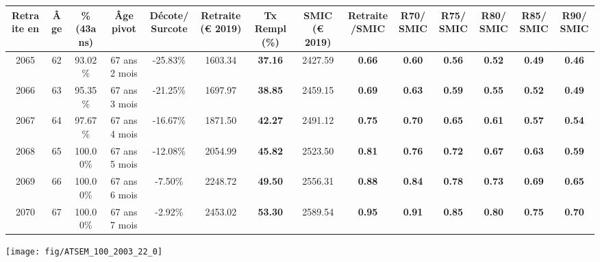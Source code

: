 \begin{adjustbox}{max width=\textwidth} 
\begin{tabular}[htb]{|c|c||c|c|c||c|c||c|c||c|c|c|c|c|} 
\hline 
 Retraite en &  Âge &  \%(43ans) &  Âge pivot &  Décote/Surcote &  Retraite (\euro{} 2019) &  Tx Rempl(\%) &  SMIC (\euro{} 2019) &  Retraite/SMIC &  R70/SMIC &  R75/SMIC &  R80/SMIC &  R85/SMIC &  R90/SMIC \\ 
\hline \hline 
 2065 &  62 &  93.02\% &  67 ans 2 mois &  -25.83\% &  1603.34 &  {\bf 37.16} &  2427.59 &  {\bf {\color{red} 0.66}} &  {\bf {\color{red} 0.60}} &  {\bf {\color{red} 0.56}} &  {\bf {\color{red} 0.52}} &  {\bf {\color{red} 0.49}} &  {\bf {\color{red} 0.46}} \\ 
\hline 
 2066 &  63 &  95.35\% &  67 ans 3 mois &  -21.25\% &  1697.97 &  {\bf 38.85} &  2459.15 &  {\bf {\color{red} 0.69}} &  {\bf {\color{red} 0.63}} &  {\bf {\color{red} 0.59}} &  {\bf {\color{red} 0.55}} &  {\bf {\color{red} 0.52}} &  {\bf {\color{red} 0.49}} \\ 
\hline 
 2067 &  64 &  97.67\% &  67 ans 4 mois &  -16.67\% &  1871.50 &  {\bf 42.27} &  2491.12 &  {\bf {\color{red} 0.75}} &  {\bf {\color{red} 0.70}} &  {\bf {\color{red} 0.65}} &  {\bf {\color{red} 0.61}} &  {\bf {\color{red} 0.57}} &  {\bf {\color{red} 0.54}} \\ 
\hline 
 2068 &  65 &  100.00\% &  67 ans 5 mois &  -12.08\% &  2054.99 &  {\bf 45.82} &  2523.50 &  {\bf {\color{red} 0.81}} &  {\bf {\color{red} 0.76}} &  {\bf {\color{red} 0.72}} &  {\bf {\color{red} 0.67}} &  {\bf {\color{red} 0.63}} &  {\bf {\color{red} 0.59}} \\ 
\hline 
 2069 &  66 &  100.00\% &  67 ans 6 mois &  -7.50\% &  2248.72 &  {\bf 49.50} &  2556.31 &  {\bf {\color{red} 0.88}} &  {\bf {\color{red} 0.84}} &  {\bf {\color{red} 0.78}} &  {\bf {\color{red} 0.73}} &  {\bf {\color{red} 0.69}} &  {\bf {\color{red} 0.65}} \\ 
\hline 
 2070 &  67 &  100.00\% &  67 ans 7 mois &  -2.92\% &  2453.02 &  {\bf 53.30} &  2589.54 &  {\bf {\color{red} 0.95}} &  {\bf {\color{red} 0.91}} &  {\bf {\color{red} 0.85}} &  {\bf {\color{red} 0.80}} &  {\bf {\color{red} 0.75}} &  {\bf {\color{red} 0.70}} \\ 
\hline 
\hline 
\end{tabular} 
\end{adjustbox} 
 
 \vspace{0.1cm} 

 {\hspace{-2.2cm}\texttt{[image: fig/ATSEM\_100\_2003\_22\_0]}} 

